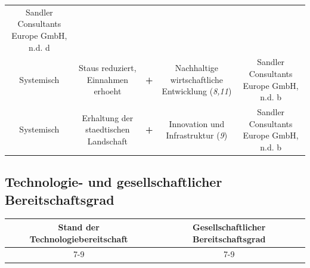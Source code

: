 \documentclass[
]{book}
\begin{document}
\begin{longtable}[]{@{}ccccc@{}}
\begin{minipage}[t]{0.17\columnwidth}
Sandler Consultants Europe GmbH, n.d. d\strut
\end{minipage}\tabularnewline
\begin{minipage}[t]{0.17\columnwidth}\centering
Systemisch\strut
\end{minipage} & \begin{minipage}[t]{0.16\columnwidth}\centering
Staus reduziert, Einnahmen erhoeht\strut
\end{minipage} & \begin{minipage}[t]{0.17\columnwidth}\centering
\textbf{+}\strut
\end{minipage} & \begin{minipage}[t]{0.17\columnwidth}\centering
Nachhaltige wirtschaftliche Entwicklung (\emph{8,11})\strut
\end{minipage} & \begin{minipage}[t]{0.17\columnwidth}\centering
Sandler Consultants Europe GmbH, n.d. b\strut
\end{minipage}\tabularnewline
\begin{minipage}[t]{0.17\columnwidth}\centering
Systemisch\strut
\end{minipage} & \begin{minipage}[t]{0.16\columnwidth}\centering
Erhaltung der staedtischen Landschaft\strut
\end{minipage} & \begin{minipage}[t]{0.17\columnwidth}\centering
\textbf{+}\strut
\end{minipage} & \begin{minipage}[t]{0.17\columnwidth}\centering
Innovation und Infrastruktur (\emph{9})\strut
\end{minipage} & \begin{minipage}[t]{0.17\columnwidth}\centering
Sandler Consultants Europe GmbH, n.d. b\strut
\end{minipage}\tabularnewline
\bottomrule
\end{longtable}

\hypertarget{technologie--und-gesellschaftlicher-bereitschaftsgrad-15}{%
\subsection*{Technologie- und gesellschaftlicher Bereitschaftsgrad}\label{technologie--und-gesellschaftlicher-bereitschaftsgrad-15}}

\begin{longtable}[]{@{}cc@{}}
\toprule
Stand der Technologiebereitschaft & Gesellschaftlicher Bereitschaftsgrad\tabularnewline
\midrule
\endhead
7-9 & 7-9\tabularnewline
\bottomrule
\end{longtable}
\end{document}
